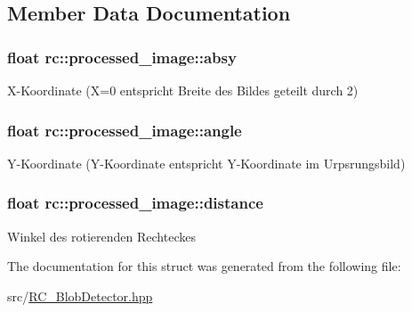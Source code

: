 \subsection{Member Data Documentation}
\hypertarget{structrc_1_1processed__image_a3885be6e15744069afb4b429777497fa}{
\subsubsection[{absy}]{\setlength{\rightskip}{0pt plus 5cm}float rc\+::processed\+\_\+image\+::absy}}\label{structrc_1_1processed__image_a3885be6e15744069afb4b429777497fa}
X-\/\+Koordinate (X=0 entspricht Breite des Bildes geteilt durch 2) \hypertarget{structrc_1_1processed__image_ac17fea85630583e2cf1de55b89334e4f}{
\subsubsection[{angle}]{\setlength{\rightskip}{0pt plus 5cm}float rc\+::processed\+\_\+image\+::angle}}\label{structrc_1_1processed__image_ac17fea85630583e2cf1de55b89334e4f}
Y-\/\+Koordinate (Y-\/\+Koordinate entspricht Y-\/\+Koordinate im Urpsrungsbild) \hypertarget{structrc_1_1processed__image_a6f90b2318450001568fcc112e294f8df}{
\subsubsection[{distance}]{\setlength{\rightskip}{0pt plus 5cm}float rc\+::processed\+\_\+image\+::distance}}\label{structrc_1_1processed__image_a6f90b2318450001568fcc112e294f8df}
Winkel des rotierenden Rechteckes 

The documentation for this struct was generated from the following file\+:\begin{DoxyCompactItemize}
\item 
src/\hyperlink{RC__BlobDetector_8hpp}{R\+C\+\_\+\+Blob\+Detector.\+hpp}\end{DoxyCompactItemize}
